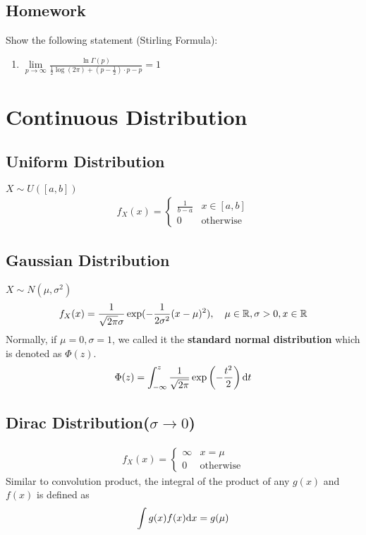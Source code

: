 	\subsection{Homework}
	Show the following statement (Stirling Formula):
	\begin{enumerate}[(1)]
		\item $\lim\limits_{p\to \infty} \frac{\ln\Gamma(p)}{\frac{1}{2}\log(2\pi)+(p-\frac{1}{2})\cdot p-p}=1$
	\end{enumerate}
\section{Continuous Distribution}
	\subsection{Uniform Distribution}
	$X\sim U(\left[a,b\right])$
	\begin{eqnarray}
		f_X(x)=\left\{
		\begin{array}{ll}
			\frac{1}{b-a} & x\in\left[a,b\right]\\
			0 &\text{otherwise}
		\end{array}
		\right.
	\end{eqnarray}
	
	\subsection{Gaussian Distribution}
		$X\sim N(\mu, \sigma^2)$
		$$f_X(x)=\frac{1}{\sqrt{2\pi}\sigma}\exp(-\frac{1}{2\sigma^2}(x-\mu)^2), \quad \mu\in\mathbb{R},\sigma>0,x\in\mathbb{R}$$
 		Normally, if $\mu=0,\sigma=1$, we called it the \textbf{standard normal distribution} which is denoted as $\Phi(z)$.
 		$$\Phi(z)=\int_{-\infty}^{z}\frac{1}{\sqrt{2\pi}}\exp\left(-\frac{t^2}{2}\right)\mathrm{d} t$$
 		
 	\subsection{Dirac Distribution($\sigma\to 0$)}
 		\begin{eqnarray}
 			f_X(x)=\left\{
 			\begin{array}{ll}
 				\infty & x=\mu\\
 				0 & \text{otherwise}
 			\end{array}
 			\right.
 		\end{eqnarray}
 		Similar to convolution product, the integral of the product of any $g(x)$ and $f(x)$ is defined as 
 		$$\int g(x)f(x)\mathrm{d} x=g(\mu)$$
 		
